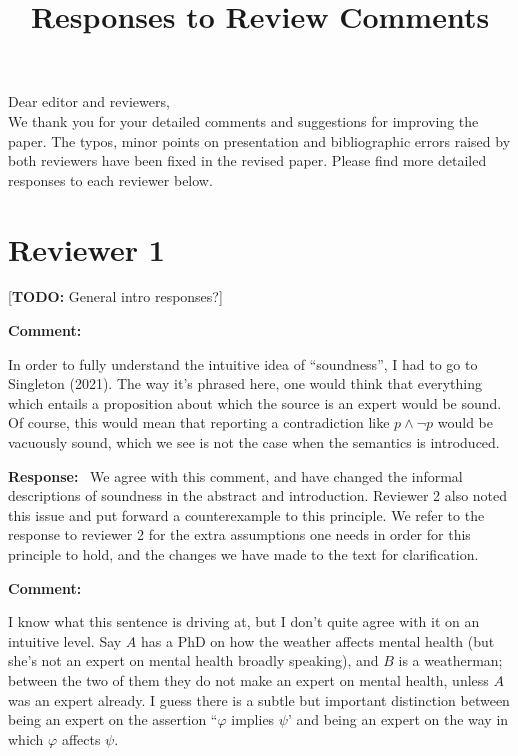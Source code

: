\documentclass[12pt]{article}
\title{%
    Responses to Review Comments
}
\author{}
\date{}
\newcommand\todo[1]{{\color{red} [\textbf{TODO:} {#1}]}}
\newenvironment{comment}{
    \noindent\textbf{Comment:}\
    \em
}{\vspace{5mm}}
\newenvironment{response}{
    \noindent\textbf{Response:}\
}{\vspace{5mm}}
\renewcommand{\phi}{\varphi}
\begin{document}
\maketitle

Dear editor and reviewers,\\

We thank you for your detailed comments and suggestions for improving the
paper. The typos, minor points on presentation and bibliographic errors raised
by both reviewers have been fixed in the revised paper. Please find more
detailed responses to each reviewer below.

\section*{Reviewer 1}

\todo{General intro responses?}

\begin{comment}
    In order to fully understand the intuitive idea of ``soundness'', I had to
    go to Singleton (2021). The way it’s phrased here, one would think that
    everything which entails a proposition about which the source is an expert
    would be sound. Of course, this would mean that reporting a contradiction
    like $p \land \neg p$ would be vacuously sound, which we see is not the
    case when the semantics is introduced.
\end{comment}

\begin{response}
    We agree with this comment, and have changed the informal descriptions of
    soundness in the abstract and introduction. Reviewer 2 also noted this
    issue and put forward a counterexample to this principle. We refer to the
    response to reviewer 2 for the extra assumptions one needs in order for
    this principle to hold, and the changes we have made to the text for
    clarification.
\end{response}

\begin{comment}
    I know what this sentence is driving at, but I don’t quite agree with it on
    an intuitive level. Say $A$ has a PhD on how the weather affects mental
    health (but she's not an expert on mental health broadly speaking), and $B$
    is a weatherman; between the two of them they do not make an expert on
    mental health, unless $A$ was an expert already.  I guess there is a subtle
    but important distinction between being an expert on the assertion ``$\phi$
    implies $\psi$’ and being an expert on the way in which $\phi$ affects
    $\psi$.
\end{comment}
\end{document}

